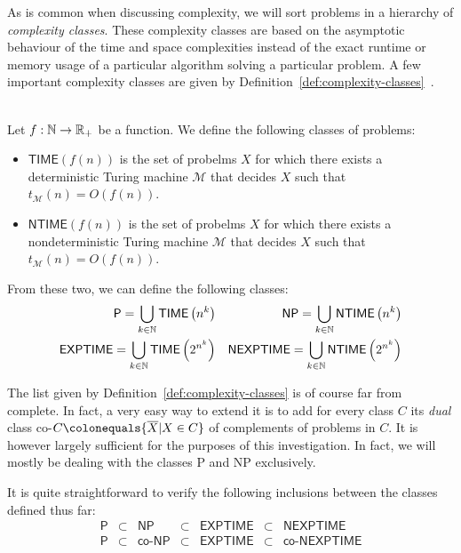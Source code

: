 As is common when discussing complexity, we will sort problems in a hierarchy of \emph{complexity classes}. These complexity classes are based on the asymptotic behaviour of the time and space complexities instead of the exact runtime or memory usage of a particular algorithm solving a particular problem. A few important complexity classes are given by Definition~\ref{def:complexity-classes}~\cite{complexity-modern}.

\begin{definition}\ \\
    \label{def:complexity-classes}
    Let \(f: \mathbb{N} \rightarrow \mathbb{R}_+\) be a function. We define the following classes of problems:
    \begin{itemize}
        \item \(\textsf{TIME}(f(n))\) is the set of probelms \(X\) for which there exists a deterministic Turing machine \(\mathcal{M}\) that decides \(X\) such that \(t_{\mathcal{M}}(n) = O(f(n))\).
        \item 
        \(\textsf{NTIME}(f(n))\) is the set of probelms \(X\) for which there exists a nondeterministic Turing machine \(\mathcal{M}\) that decides \(X\) such that \(t_{\mathcal{M}}(n) = O(f(n))\).    
    \end{itemize}
    From these two, we can define the following classes:
    \begin{align*}
        \textsf{P} = \bigcup\limits_{k\in\mathbb{N}} \textsf{TIME}\left(n^k\right)& &
        \textsf{NP} = \bigcup\limits_{k\in\mathbb{N}} \textsf{NTIME}\left(n^k\right) \\
        \textsf{EXPTIME} = \bigcup\limits_{k\in\mathbb{N}} \textsf{TIME}\left(2^{n^k}\right) & &
        \textsf{NEXPTIME} = \bigcup\limits_{k\in\mathbb{N}} \textsf{NTIME}\left(2^{n^k}\right) \\
    \end{align*}
\end{definition}

The list given by Definition~\ref{def:complexity-classes} is of course far from complete. In fact, a very easy way to extend it is to add for every class \(C\) its \emph{dual} class co-\({C} \colonequals \{\overline{X}| X\in C\}\) of complements of problems in \(C\).
It is however largely sufficient for the purposes of this investigation. In fact, we will mostly be dealing with the classes \textsf{P} and \textsf{NP} exclusively.

It is quite straightforward to verify the following inclusions between the classes defined thus far:
\[
    \begin{array}{ccccccc}        
        \textsf{P} &\subset& \textsf{NP} &\subset& \textsf{EXPTIME} &\subset& \textsf{NEXPTIME} \\
        \textsf{P} &\subset& \textsf{co-NP} &\subset& \textsf{EXPTIME} &\subset& \textsf{co-NEXPTIME}
    \end{array}
\]

